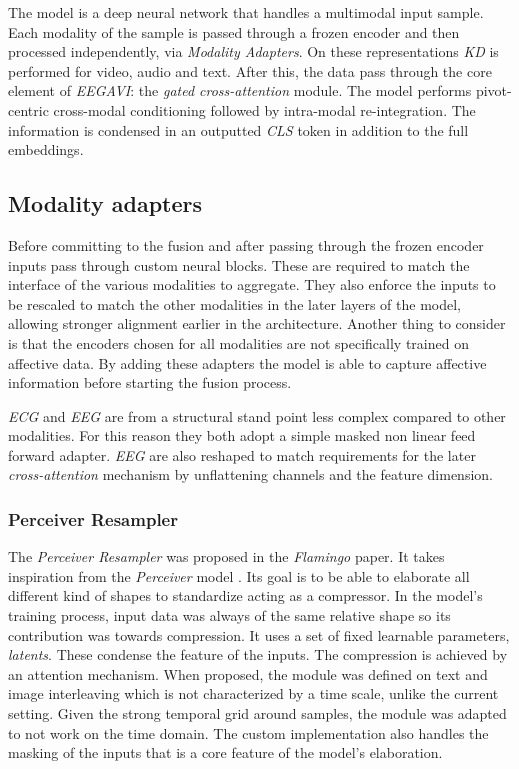 The model is a deep neural network that handles a multimodal input sample.
Each modality of the sample is passed through a frozen encoder and then processed independently, via \textit{Modality Adapters}.
On these representations \textit{KD} is performed for video, audio and text.
After this, the data pass through the core element of \textit{EEGAVI}: the \textit{gated cross-attention} module.
The model performs pivot-centric cross-modal conditioning followed by intra-modal re-integration.
The information is condensed in an outputted \textit{CLS} token in addition to the full embeddings.

\subsection{Modality adapters}
Before committing to the fusion and after passing through the frozen encoder inputs pass through custom neural blocks.
These are required to match the interface of the various modalities to aggregate.
They also enforce the inputs to be rescaled to match the other modalities in the later layers of the model, allowing stronger alignment earlier in the architecture.
Another thing to consider is that the encoders chosen for all modalities are not specifically trained on affective data. By adding these adapters the model is able to capture affective information before starting the fusion process.

\textit{ECG} and \textit{EEG} are from a structural stand point less complex compared to other modalities.
For this reason they both adopt a simple masked non linear feed forward adapter.
\textit{EEG} are also reshaped to match requirements for the later \textit{cross-attention} mechanism by unflattening channels and the feature dimension.

\subsubsection{Perceiver Resampler}
The \textit{Perceiver Resampler} was proposed in the \textit{Flamingo} paper.
It takes inspiration from the \textit{Perceiver} model \cite{}.%
Its goal is to be able to elaborate all different kind of shapes to standardize acting as a compressor.
In the model's training process, input data was always of the same relative shape so its contribution was towards compression.
It uses a set of fixed learnable parameters, \textit{latents}.
These condense the feature of the inputs.
The compression is achieved by an attention mechanism.
When proposed, the module was defined on text and image interleaving which is not characterized by a time scale, unlike the current setting.
Given the strong temporal grid around samples, the module was adapted to not work on the time domain. The custom implementation also handles the masking of the inputs that is a core feature of the model's elaboration.

